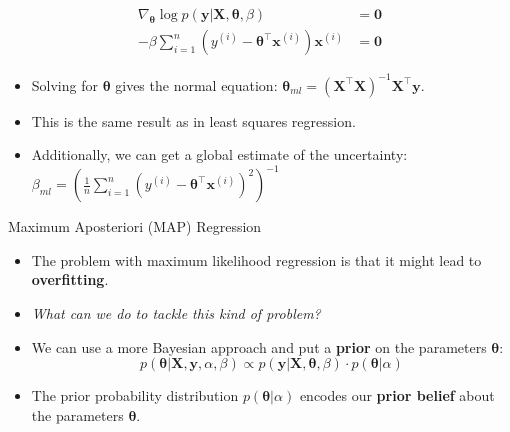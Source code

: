 \begin{frame}
	\begin{align}
		\nabla_{\bm{\theta}} \log p(\bm{y} \vert \bm{X}, \bm{\theta}, \beta)
			&= \bm{0} \\
		-\beta \sum_{i=1}^n (y^{(i)} - \bm{\theta}^{\intercal} \bm{x}^{(i)}) \bm{x}^{(i)}
			&= \bm{0}
	\end{align}
	
	\begin{itemize}
		\item Solving for $\bm{\theta}$ gives the normal equation: $\bm{\theta}_{ml} = (\bm{X}^{\intercal} \bm{X})^{-1} \bm{X}^{\intercal} \bm{y}$.
		\item This is the same result as in least squares regression.
		\item Additionally, we can get a global estimate of the uncertainty: $\beta_{ml} = \left( \frac{1}{n} \sum_{i=1}^n (y^{(i)} - \bm{\theta}^{\intercal} \bm{x}^{(i)})^2 \right)^{-1}$
	\end{itemize}

\end{frame}


\begin{dwHeaderFrame}{Maximum Aposteriori (MAP) Regression}
	\begin{itemize}
		\item The problem with maximum likelihood regression is that it might lead to \textbf{overfitting}.
		\item \textit{What can we do to tackle this kind of problem?}
		\item We can use a more Bayesian approach and put a \textbf{prior} on the parameters $\bm{\theta}$:
		\begin{equation}
			p(\bm{\theta} \vert \bm{X}, \bm{y}, \alpha, \beta) \propto p(\bm{y} \vert \bm{X}, \bm{\theta}, \beta) \cdot p(\bm{\theta} \vert \alpha)
		\end{equation}
		\item The prior probability distribution $p(\bm{\theta} \vert \alpha)$ encodes our \textbf{prior belief} about the parameters $\bm{\theta}$.
	\end{itemize}
	
\end{dwHeaderFrame}


